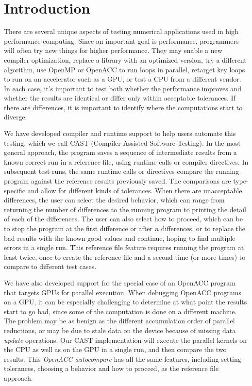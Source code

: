 \section{Introduction}

There are several unique aspects of testing numerical applications used in high performance computing.
Since an important goal is performance, programmers will often try new things for higher performance.
They may enable a new compiler optimization, replace a library with an optimized version, try a different algorithm, use OpenMP or OpenACC to run loops in parallel, retarget key loops to run on an accelerator such as a GPU, or test a CPU from a different vendor.
In each case, it's important to test both whether the performance improves and whether the results are identical or differ only within acceptable tolerances.
If there are differences, it is important to identify where the computations start to diverge.

We have developed compiler and runtime support to help users automate this testing, which we call CAST (Compiler-Assisted Software Testing).
In the most general approach, the program saves a sequence of intermediate results from a known correct run in a reference file, using runtime calls or compiler directives.
In subsequent test runs, the same runtime calls or directives compare the running program against the reference results previously saved.
The comparisons are type-specific and allow for different kinds of tolerances.
When there are unacceptable differences, the user can select the desired behavior, which can range from returning the number of differences to the running program to printing the detail of each of the differences.
The user can also select how to proceed, which can be to stop the program at the first difference or after $n$ differences, or to replace the bad results with the known good values and continue, hoping to find multiple errors in a single run.
This reference file feature requires running the program at least twice, once to create the reference file and a second time (or more times) to compare to different test cases.

We have also developed support for the special case of an OpenACC program that targets GPUs for parallel execution.
When debugging OpenACC programs on a GPU, it can be especially challenging to determine at what point the results start to go bad, since some of the computation is done on a different machine.
The problem may be as benign as the different accumulation order of parallel reductions, or may be due to stale data on the device because of missing data \emph{update} operations.
Our CAST implementation will execute the parallel kernels on the CPU as well as on the GPU in a single run, and then compare the two results.
This \emph{OpenACC autocompare} has all the same features, including setting tolerances, choosing a behavior and how to proceed, as the reference file approach.

